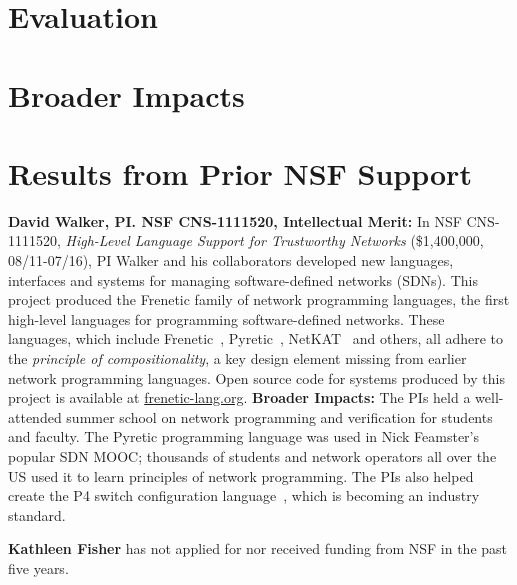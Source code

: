 




\section{Evaluation}
\label{sec:eval}


\section{Broader Impacts}
\label{sec:impact}


\section{Results from Prior NSF Support}
\label{sec:prior-support}

\noindent
{\bf David Walker, PI. NSF CNS-1111520, Intellectual Merit:}
In NSF CNS-1111520, \emph{High-Level Language Support for Trustworthy Networks}
(\$1,400,000, 08/11-07/16),
PI Walker and his collaborators developed new languages, interfaces
and systems for managing software-defined networks (SDNs).  
This project produced the Frenetic family
of network programming languages, the first high-level languages for
programming software-defined networks.  These languages, which include
Frenetic~\cite{frenetic}, 
Pyretic~\cite{pyretic},
NetKAT~\cite{netkat} and others, all adhere to the
\emph{principle of compositionality}, a key design element missing
from earlier network programming languages.  
Open source code for systems produced by this project is available
at \url{frenetic-lang.org}.
%
{\bf Broader Impacts:} 
The PIs held a well-attended summer school on network programming and 
verification for students and faculty. The
Pyretic programming language was used in Nick Feamster's popular
SDN MOOC; thousands of students and
network operators all over the US used it to learn principles of network
programming.  The PIs
also helped create the P4 switch configuration language~\cite{P4}, which is
becoming an industry standard.

\medskip
\noindent
{\bf Kathleen Fisher} has not applied for nor received funding from NSF in the past
five years.



